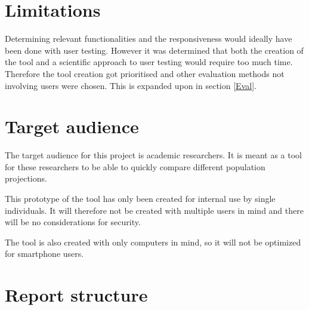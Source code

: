 \section{Limitations}\label{Lim}

Determining relevant functionalities and the responsiveness would ideally have been done with user testing.  However it was determined that both the creation of the tool and a scientific approach to user testing would require too much time.
Therefore the tool creation got prioritised and other evaluation methods not involving users were chosen. This is expanded upon in section \ref{Eval}.

\section{Target audience}\label{TA}

The target audience for this project is academic researchers. It is meant as a tool for these researchers to be able to quickly compare different population projections. 

This prototype of the tool has only been created for internal use by single individuals. It will therefore not be created with multiple users in mind and there will be no considerations for security.

The tool is also created with only computers in mind, so it will not be optimized for smartphone users. 

\section{Report structure}

%
%

